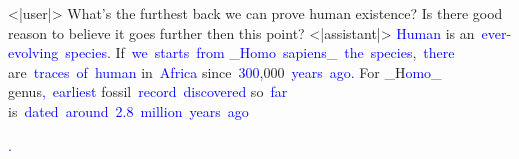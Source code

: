 \documentclass{article}
\begin{document}
\begin{tcolorbox}[colframe=black,colback=white]
<|user|>
What's the furthest back we can prove human existence? Is there good reason to believe it goes further then this point?
<|assistant|>
\textcolor{blue}{Human} is an\textcolor{blue}{~ever}\textcolor{blue}{-ev}\textcolor{blue}{olving}\textcolor{blue}{~species}. If\textcolor{blue}{~we}\textcolor{blue}{~starts}\textcolor{blue}{~from} \_\textcolor{blue}{H}\textcolor{blue}{omo}\textcolor{blue}{~sapi}\textcolor{blue}{ens}\_\textcolor{blue}{~the}\textcolor{blue}{~species},\textcolor{blue}{~there} are\textcolor{blue}{~traces}\textcolor{blue}{~of}\textcolor{blue}{~human} in\textcolor{blue}{~Africa} since\textcolor{blue}{~}\textcolor{blue}{300}\textcolor{blue}{,}000\textcolor{blue}{~years}\textcolor{blue}{~ago}\textcolor{blue}{.} For \_H\textcolor{blue}{omo}\_ genus\textcolor{blue}{,}\textcolor{blue}{~earliest} fossil\textcolor{blue}{~record}\textcolor{blue}{~discovered} so\textcolor{blue}{~far} is\textcolor{blue}{~dated}\textcolor{blue}{~around}\textcolor{blue}{~}\textcolor{blue}{2}\textcolor{blue}{.}\textcolor{blue}{8}\textcolor{blue}{~million}\textcolor{blue}{~years}\textcolor{blue}{~ago}\textcolor{blue}{.

}
\end{tcolorbox}
\end{document}
